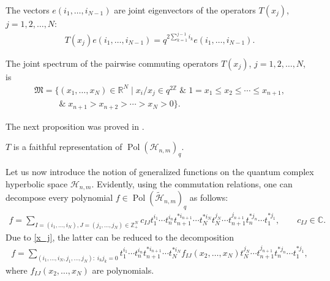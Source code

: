 \documentclass[pdftex]{sigma}
\begin{document}
The vectors $e(i_1,\ldots,i_{N-1})$ are joint eigenvectors of the operators $T(x_j)$, $j=1,2,\ldots,N$:
\begin{gather*}%
T(x_j)e(i_1,\ldots,i_{N-1})= q^{2\sum\limits_{k=1}^{j-1}i_k}e(i_1,\ldots,i_{N-1}).
\end{gather*}

The joint spectrum of the pairwise commuting operators $T(x_j)$, $j=1,2,\ldots,N$, is
\begin{gather*}
\mathfrak{M}=\big\{(x_1,\ldots,x_N)\in\mathbb{R}^N \;| \; x_i/x_j\in q^{2\mathbb{Z}}\;\&\;1=x_1\le x_2\le\cdots\le
x_{n+1}, \\
\phantom{\mathfrak{M}=\big\{}{} \&\; x_{n+1}>x_{n+2}>\cdots>x_N>0\big\}.
\end{gather*}

The next proposition was proved in \cite{BS}.

\begin{proposition}
$T$ is a faithful representation of $\operatorname{Pol}(\mathscr{H}_{n,m})_q$.
\end{proposition}



Let us now introduce the notion of generalized functions on the quantum complex hyperbolic space
$\mathscr{H}_{n,m}$. Evidently, using the commutation relations, one can decompose every polynomial $f \in
\operatorname{Pol}(\widetilde{\mathscr{H}}_{n,m})_q$ as follows:
\begin{gather}\label{decomp_pol_Hnm_0}
f= \!\!\!\sum_{I=(i_1,\ldots,i_N), J=(j_1,\ldots,j_N) \in \mathbb Z_+^N}\!\!\! c_{IJ}t_1^{i_1}\cdots
t_n^{i_n}t_{n+1}^{*i_{n+1}}\cdots t_N^{*i_N}t_N^{j_N}\cdots t_{n+1}^{j_{n+1}}t_n^{*j_n}\cdots t_1^{*j_1},
\!\!\!\qquad c_{IJ} \in \mathbb C.\!\!\!
\end{gather}
Due to \eqref{x_j}, the latter can be reduced to the decomposition{\samepage
\begin{gather}\label{decomp_pol_Hnm}
f=\sum_{(i_1,\ldots,i_N,j_1,\ldots,j_N):\;i_kj_k=0} t_1^{i_1}\cdots t_n^{i_n}t_{n+1}^{*i_{n+1}}\cdots
t_N^{*i_N}f_{IJ}(x_2,\ldots,x_N)t_N^{j_N}\cdots t_{n+1}^{j_{n+1}}t_n^{*j_n}\cdots t_1^{*j_1},
\end{gather}
where $f_{IJ}(x_2,\ldots,x_N)$ are polynomials.}
\end{document}

